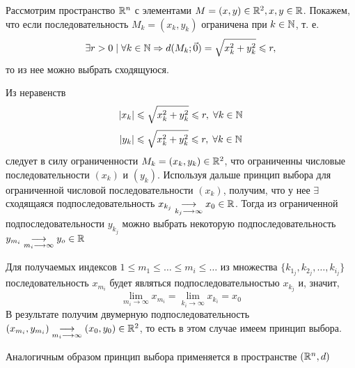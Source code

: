 \documentclass[../../main.tex]{subfiles}
\begin{document}
	\begin{exmp}
		Рассмотрим пространство $\mathbb{R}^n$ с элементами
		$M=(x,y) \in \mathbb{R}^2, x,y \in \mathbb{R}$. 
		Покажем, что если последовательность $M_k=(x_k,y_k)$ ограничена 
		при $k \in \mathbb{N}$, т. е.
		\[
		\exists r>0 \; | \; \forall k \in \mathbb{N} 
		\Rightarrow d(M_k; \vec0)=\sqrt{x^2_k+y^2_k} \leqslant r,
		\]
		то из нее можно выбрать сходящуюся.
		
		Из неравенств
		\[ 
		|x_k| \leqslant \sqrt{x^2_k+y^2_k}\leqslant r, \; \forall k \in \mathbb{N} 
		\]
		\[ 
		|y_k| \leqslant \sqrt{x^2_k+y^2_k}\leqslant r, \; \forall k \in \mathbb{N} 
		\]
		следует в силу ограниченности $M_k=(x_k,y_k) \in \mathbb{R}^2$, 
		что ограниченны числовые последовательности 
		$(x_k)$ и $(y_k)$. 
		Используя дальше принцип выбора для ограниченной 
		числовой последовательности $(x_k)$,
		получим, что у нее $\exists$ сходящаяся подпоследовательность
		$x_{k_j}\underset{k_j \longrightarrow \infty}
		{\longrightarrow}x_0 \in \mathbb{R}$.
		Тогда из ограниченной подпоследовательности $y_{k_j}$ 
		можно выбрать некоторую подпоследовательность
		$y_{m_i}\underset{m_i\longrightarrow \infty}
		{\longrightarrow}y_o \in \mathbb{R}$
		
		Для получаемых индексов $1 \leqslant m_1 \leqslant \dots 
		\leqslant m_i \leqslant \dots $ из множества
		$\{k_{1_j}, k_{2_j}, \dots, k_{i_j}\}$
		последовательность $ x_{m_i} $ будет являться 
		подпоследовательностью $ x_{k_j} $ и, значит, 
		\[  \lim_{m_i \to \infty}{x_{m_i}}= 
		\lim_{k_i \to \infty}{x_{k_i}}=  x_0\]
		В результате получим двумерную подпоследовательность 
		$(x_{m_i}, y_{m_i}) \underset{m_i\longrightarrow \infty}
		{\longrightarrow} (x_0, y_0) \in \mathbb{R}^2$,
		то есть в этом случае имеем принцип выбора.
		
		Аналогичным образом принцип выбора применяется в пространстве $(\mathbb{R}^n, d)$
	\end{exmp}
\end{document}
